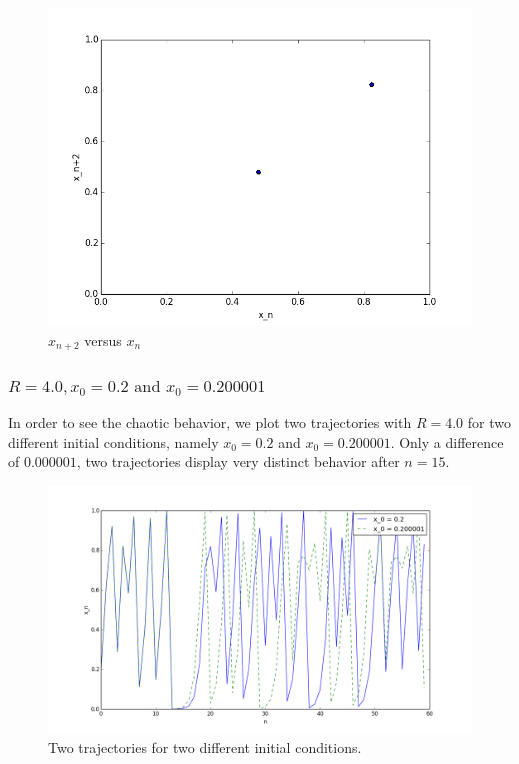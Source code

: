 \documentclass{article}
\begin{document}
\begin{figure}
	\centering
	\includegraphics[scale = 0.4]{figs/R33_x0_02_fig3.png}
	\caption{$x_{n+2}$ versus $x_{n}$}
	\label{4}
\end{figure}

\subsubsection*{$R = 4.0, x_{0} = 0.2 \text{ and } x_{0} = 0.200001$ }
In order to see the chaotic behavior, we plot two trajectories with $R = 4.0$ for two different initial conditions, namely $x_{0} = 0.2$ and $x_{0} = 0.200001$. Only a difference of $0.000001$, two trajectories display very distinct behavior after $n = 15$.

\begin{figure}
	\centering
	\includegraphics[scale = 0.4]{figs/two_trajectories_R4.png}
	\caption{Two trajectories for two different initial conditions.}
	\label{4}
\end{figure}
\end{document}
